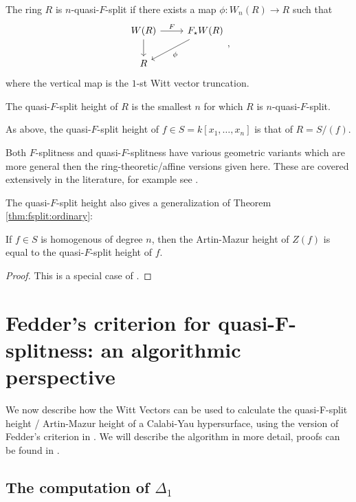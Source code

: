 \begin{defn}
	The ring \(R\) is \(n\)-quasi-\(F\)-split if there exists
	a map \(\phi \colon W_{n}(R) \xrightarrow{} R\) such that
	\[
	\begin{tikzcd}
		W(R) \arrow{r}{F} \arrow{d}[swap]{} &
		F_{\star}W(R) \arrow{ld}{\phi} \\
	R 
	\end{tikzcd}
	,\]
	where the vertical map is the \(1\)-st Witt vector truncation.

	The quasi-\(F\)-split height of \(R\) is the smallest \(n\) 
	for which \(R\) is \(n\)-quasi-\(F\)-split.

	As above, the quasi-\(F\)-split height of 
	\(f \in S = k[x_{1}, \ldots, x_{n}]\) is that
	of \(R = S / (f)\).
\end{defn}

\begin{rmk}
	Both \(F\)-splitness and quasi-\(F\)-splitness have 
	various geometric
	variants which are more general then the 
	ring-theoretic/affine versions given here. 
	These are covered extensively in the literature, for example
	see \cite{kttwyy-2022-qfs-birat}.
\end{rmk}

The quasi-\(F\)-split height also gives a generalization
of Theorem \ref{thm:fsplit:ordinary}:

\begin{thm}
	If \(f \in S\) is homogenous of degree \(n\),
	then the Artin-Mazur height of \(Z(f)\)
	is equal to the quasi-\(F\)-split height
	of \(f\).
\end{thm}

\begin{proof}
	This is a special case of 
	\cite[Theorem~4.5]{yobuko-2019-qfs-calabi-yau}.
\end{proof}

\section{Fedder's criterion for quasi-F-splitness: an algorithmic perspective}

We now describe how the Witt Vectors can be used to calculate the 
quasi-F-split height / Artin-Mazur height of a Calabi-Yau 
hypersurface, using the version of Fedder's criterion in \cite{kty-2022-fedder}.
We will describe the algorithm in more detail, proofs can be
found in \cite{kty-2022-fedder}.

\subsection{The computation of \(\Delta_{1}\)}

